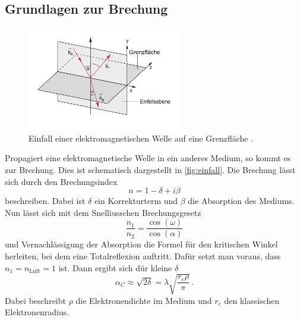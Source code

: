 \subsection{Grundlagen zur Brechung}
\begin{figure}
    \centering
    \includegraphics[width=0.6\textwidth]{pictures/Einfall.pdf}
    \caption{Einfall einer elektromagnetischen Welle auf eine Grenzfläche \cite{demtroeder2}.}
    \label{fig:einfall}
\end{figure}
Propagiert eine elektromagnetische Welle in ein anderes Medium, so kommt es zur Brechung.
Dies ist schematisch dargestellt in \autoref{fig:einfall}.
Die Brechung lässt sich durch den Brechungsindex
\begin{equation}
    n = 1 - \delta + i \beta
\end{equation}
beschreiben. Dabei ist $\delta$ ein Korrekturterm und $\beta$ die Absorption des Mediums.
Nun lässt sich mit dem Snelliusschen Brechungsgesetz
\begin{equation}
    \frac{n_1}{n_2} = \frac{\cos (\omega)}{\cos (\alpha)}
\end{equation}
und Vernachlässigung der Absorption die Formel für den kritischen Winkel herleiten, bei dem eine Totalreflexion auftritt.
Dafür setzt man voraus, dass $n_1 = n_\text{Luft} = 1$ ist.
Dann ergibt sich dür kleine $\delta$ \cite{tolan_xray}
\begin{equation}
    \alpha_C \approx \sqrt{2 \delta} = \lambda \sqrt{\frac{r_e \rho}{\pi}} \, .
\end{equation}
Dabei beschreibt $\rho$ die Elektronendichte im Medium und $r_e$ den klassischen Elektronenradius.

